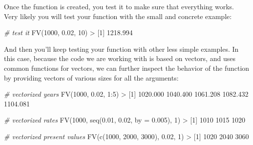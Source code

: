 \documentclass[
]{book}
\newenvironment{Shaded}{\begin{snugshade}}{\end{snugshade}}
\newcommand{\AttributeTok}[1]{\textcolor[rgb]{0.77,0.63,0.00}{#1}}
\newcommand{\CommentTok}[1]{\textcolor[rgb]{0.56,0.35,0.01}{\textit{#1}}}
\newcommand{\DecValTok}[1]{\textcolor[rgb]{0.00,0.00,0.81}{#1}}
\newcommand{\FloatTok}[1]{\textcolor[rgb]{0.00,0.00,0.81}{#1}}
\newcommand{\FunctionTok}[1]{\textcolor[rgb]{0.00,0.00,0.00}{#1}}
\newcommand{\NormalTok}[1]{#1}
\newcommand{\SpecialCharTok}[1]{\textcolor[rgb]{0.00,0.00,0.00}{#1}}
\begin{document}
Once the function is created, you test it to make sure that everything works.
Very likely you will test your function with the small and concrete example:

\begin{Shaded}
\begin{Highlighting}[]
\CommentTok{\# test it}
\FunctionTok{FV}\NormalTok{(}\DecValTok{1000}\NormalTok{, }\FloatTok{0.02}\NormalTok{, }\DecValTok{10}\NormalTok{)}
\SpecialCharTok{\textgreater{}}\NormalTok{ [}\DecValTok{1}\NormalTok{] }\FloatTok{1218.994}
\end{Highlighting}
\end{Shaded}

And then you'll keep testing your function with other less simple examples.
In this case, because the code we are working with is based on vectors,
and uses common functions for vectors, we can further inspect the behavior of
the function by providing vectors of various sizes for all the arguments:

\begin{Shaded}
\begin{Highlighting}[]
\CommentTok{\# vectorized years}
\FunctionTok{FV}\NormalTok{(}\DecValTok{1000}\NormalTok{, }\FloatTok{0.02}\NormalTok{, }\DecValTok{1}\SpecialCharTok{:}\DecValTok{5}\NormalTok{)}
\SpecialCharTok{\textgreater{}}\NormalTok{ [}\DecValTok{1}\NormalTok{] }\FloatTok{1020.000} \FloatTok{1040.400} \FloatTok{1061.208} \FloatTok{1082.432} \FloatTok{1104.081}
\end{Highlighting}
\end{Shaded}

\begin{Shaded}
\begin{Highlighting}[]
\CommentTok{\# vectorized rates}
\FunctionTok{FV}\NormalTok{(}\DecValTok{1000}\NormalTok{, }\FunctionTok{seq}\NormalTok{(}\FloatTok{0.01}\NormalTok{, }\FloatTok{0.02}\NormalTok{, }\AttributeTok{by =} \FloatTok{0.005}\NormalTok{), }\DecValTok{1}\NormalTok{)}
\SpecialCharTok{\textgreater{}}\NormalTok{ [}\DecValTok{1}\NormalTok{] }\DecValTok{1010} \DecValTok{1015} \DecValTok{1020}
\end{Highlighting}
\end{Shaded}

\begin{Shaded}
\begin{Highlighting}[]
\CommentTok{\# vectorized present values}
\FunctionTok{FV}\NormalTok{(}\FunctionTok{c}\NormalTok{(}\DecValTok{1000}\NormalTok{, }\DecValTok{2000}\NormalTok{, }\DecValTok{3000}\NormalTok{), }\FloatTok{0.02}\NormalTok{, }\DecValTok{1}\NormalTok{)}
\SpecialCharTok{\textgreater{}}\NormalTok{ [}\DecValTok{1}\NormalTok{] }\DecValTok{1020} \DecValTok{2040} \DecValTok{3060}
\end{Highlighting}
\end{Shaded}
\end{document}
